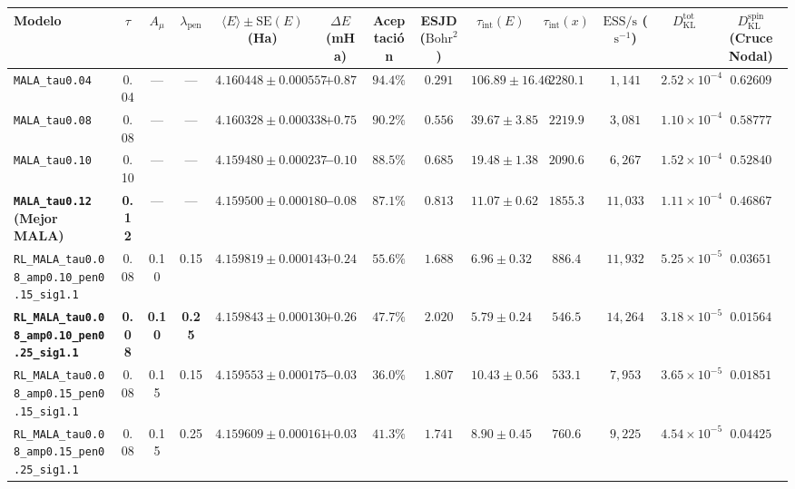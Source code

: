 \documentclass[10pt,a4paper]{article}
\begin{document}
\begin{table}[H]
\centering
\begin{adjustbox}{max width=\textwidth}
\begin{tabular}{lcccccccccccc}
\toprule
\textbf{Modelo} & \textbf{$\tau$} & \textbf{$A_\mu$} & \textbf{$\lambda_{\mathrm{pen}}$} & \textbf{$\langle E \rangle \pm \mathrm{SE}(E)$ (Ha)} & \textbf{$\Delta E$ (mHa)} & \textbf{Aceptación} & \textbf{ESJD ($\text{Bohr}^2$)} & \textbf{$\tau_{\mathrm{int}}(E)$} & \textbf{$\tau_{\mathrm{int}}(x)$} & \textbf{$\mathrm{ESS/s}$ ($\text{s}^{-1}$)} & \textbf{$D_{\mathrm{KL}}^{\mathrm{tot}}$} & \textbf{$D_{\mathrm{KL}}^{\mathrm{spin}}$ (Cruce Nodal)} \\
\midrule
\texttt{MALA\_tau0.04} & 0.04 & --- & --- & $4.160448 \pm 0.000557$ & $+0.87$ & $94.4\%$ & $0.291$ & $106.89 \pm 16.46$ & $2280.1$ & $1,141$ & $2.52 \times 10^{-4}$ & $0.62609$ \\
\texttt{MALA\_tau0.08} & 0.08 & --- & --- & $4.160328 \pm 0.000338$ & $+0.75$ & $90.2\%$ & $0.556$ & $39.67 \pm 3.85$ & $2219.9$ & $3,081$ & $1.10 \times 10^{-4}$ & $0.58777$ \\
\texttt{MALA\_tau0.10} & 0.10 & --- & --- & $4.159480 \pm 0.000237$ & $-0.10$ & $88.5\%$ & $0.685$ & $19.48 \pm 1.38$ & $2090.6$ & $6,267$ & $1.52 \times 10^{-4}$ & $0.52840$ \\
\textbf{\texttt{MALA\_tau0.12} (Mejor MALA)} & \textbf{0.12} & --- & --- & \textbf{$4.159500 \pm 0.000180$} & \textbf{$-0.08$} & \textbf{$87.1\%$} & \textbf{$0.813$} & \textbf{$11.07 \pm 0.62$} & \textbf{$1855.3$} & \textbf{$11,033$} & \textbf{$1.11 \times 10^{-4}$} & \textbf{$0.46867$} \\
\texttt{RL\_MALA\_tau0.08\_amp0.10\_pen0.15\_sig1.1} & 0.08 & 0.10 & 0.15 & $4.159819 \pm 0.000143$ & $+0.24$ & $55.6\%$ & $1.688$ & $6.96 \pm 0.32$ & $886.4$ & $11,932$ & $5.25 \times 10^{-5}$ & $0.03651$ \\
\textbf{\texttt{RL\_MALA\_tau0.08\_amp0.10\_pen0.25\_sig1.1}} & \textbf{0.08} & \textbf{0.10} & \textbf{0.25} & \textbf{$4.159843 \pm 0.000130$} & \textbf{$+0.26$} & \textbf{$47.7\%$} & \textbf{$2.020$} & \textbf{$5.79 \pm 0.24$} & \textbf{$546.5$} & \textbf{$14,264$} & \textbf{$3.18 \times 10^{-5}$} & \textbf{$0.01564$} \\
\texttt{RL\_MALA\_tau0.08\_amp0.15\_pen0.15\_sig1.1} & 0.08 & 0.15 & 0.15 & $4.159553 \pm 0.000175$ & $-0.03$ & $36.0\%$ & $1.807$ & $10.43 \pm 0.56$ & $533.1$ & $7,953$ & $3.65 \times 10^{-5}$ & $0.01851$ \\
\texttt{RL\_MALA\_tau0.08\_amp0.15\_pen0.25\_sig1.1} & 0.08 & 0.15 & 0.25 & $4.159609 \pm 0.000161$ & $+0.03$ & $41.3\%$ & $1.741$ & $8.90 \pm 0.45$ & $760.6$ & $9,225$ & $4.54 \times 10^{-5}$ & $0.04425$ \\

\end{tabular}
\end{adjustbox}
\end{table}
\end{document}
